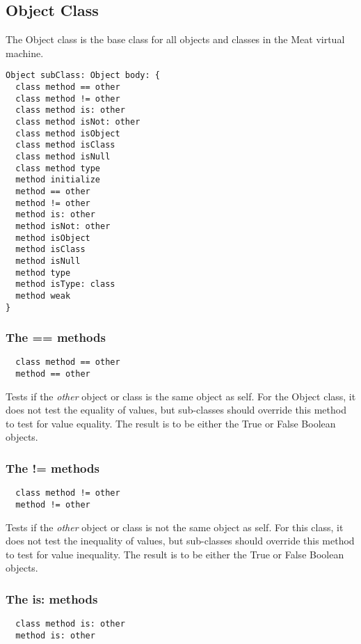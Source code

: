 \subsection {Object Class}

The Object class is the base class for all objects and classes in the Meat virtual machine.

\begin{lstlisting}
Object subClass: Object body: {
  class method == other
  class method != other
  class method is: other
  class method isNot: other
  class method isObject
  class method isClass
  class method isNull
  class method type
  method initialize
  method == other
  method != other
  method is: other
  method isNot: other
  method isObject
  method isClass
  method isNull
  method type
  method isType: class
  method weak
}
\end{lstlisting}

\subsubsection {The == methods}
\begin{lstlisting}
  class method == other
  method == other
\end{lstlisting}

Tests if the \textit{other} object or class is the same object as self. For the Object class, it does not test the equality of values, but sub-classes should override this method to test for value equality. The result is to be either the True or False Boolean objects.

\hfill
\subsubsection {The != methods}
\begin{lstlisting}
  class method != other
  method != other
\end{lstlisting}

Tests if the \textit{other} object or class is not the same object as self. For this class, it does not test the inequality of values, but sub-classes should override this method to test for value inequality. The result is to be either the True or False Boolean objects.

\hfill
\subsubsection {The is: methods}
\begin{lstlisting}
  class method is: other
  method is: other
\end{lstlisting}

